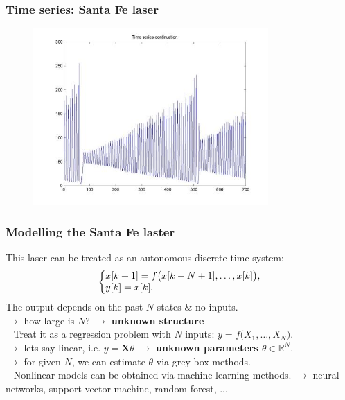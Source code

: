 \documentclass{beamer}
\begin{document}
\begin{frame}
\frametitle{Time series: Santa Fe laser}
\begin{figure}[!h]
  \centering
  \includegraphics[width=0.8\textwidth]{santafe-full.jpg}
\end{figure}
\end{frame}

\begin{frame}
\frametitle{Modelling the Santa Fe laster}
This laser can be treated as an autonomous discrete time system:
\begin{align*}
\left\{ \begin{matrix} 
x[k+1] = f\big(x[k-N+1], \ldots, x[k]\big), \\
y[k] = x[k]. \hfill
\end{matrix}\right.
\end{align*}
The output depends on the past $N$ states $\&$ no inputs.\\
\pause
$\rightarrow$ how large is $N$? $\rightarrow$ \textbf{unknown structure} \\
\ \newline
\pause
Treat it as a regression problem with $N$ inputs: $y = f\big(X_1,\ldots,X_N\big)$. \\
\pause
$\rightarrow$ lets say linear, i.e. $y = \mathbf{X}\theta$ $\rightarrow$ \textbf{unknown parameters $\theta \in \mathbb{R}^N$}. \\
\pause
$\rightarrow$ for given $N$, we can estimate $\theta$ via grey box methods.\\
\ \newline
\pause
Nonlinear models can be obtained via machine learning methods.
$\rightarrow$ neural networks, support vector machine, random forest, ...
\end{frame}
\end{document}
